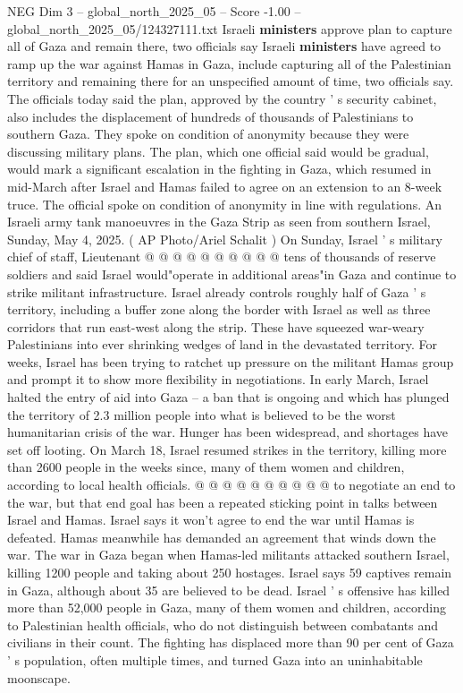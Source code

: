 \begin{textsample}{NEG Dim 3 – global\_north\_2025\_05 – Score -1.00 – global\_north\_2025\_05/124327111.txt}  \label{ex:f3_neg_317}
Israeli \textbf{ministers} approve plan to capture all of Gaza and remain there, two officials say Israeli \textbf{ministers} have agreed to ramp up the war against Hamas in Gaza, include capturing all of the Palestinian territory and remaining there for an unspecified amount of time, two officials say.
The officials today said the plan, approved by the country ' s security cabinet, also includes the displacement of hundreds of thousands of Palestinians to southern Gaza.
They spoke on condition of anonymity because they were discussing military plans.
The plan, which one official said would be gradual, would mark a significant escalation in the fighting in Gaza, which resumed in mid-March after Israel and Hamas failed to agree on an extension to an 8-week truce.
The official spoke on condition of anonymity in line with regulations.
An Israeli army tank manoeuvres in the Gaza Strip as seen from southern Israel, Sunday, May 4, 2025. ( AP Photo/Ariel Schalit ) On Sunday, Israel ' s military chief of staff, Lieutenant @ @ @ @ @ @ @ @ @ @ tens of thousands of reserve soldiers and said Israel would"operate in additional areas"in Gaza and continue to strike militant infrastructure.
Israel already controls roughly half of Gaza ' s territory, including a buffer zone along the border with Israel as well as three corridors that run east-west along the strip.
These have squeezed war-weary Palestinians into ever shrinking wedges of land in the devastated territory.
For weeks, Israel has been trying to ratchet up pressure on the militant Hamas group and prompt it to show more flexibility in negotiations.
In early March, Israel halted the entry of aid into Gaza -- a ban that is ongoing and which has plunged the territory of 2.3 million people into what is believed to be the worst humanitarian crisis of the war.
Hunger has been widespread, and shortages have set off looting.
On March 18, Israel resumed strikes in the territory, killing more than 2600 people in the weeks since, many of them women and children, according to local health officials. @ @ @ @ @ @ @ @ @ @ to negotiate an end to the war, but that end goal has been a repeated sticking point in talks between Israel and Hamas.
Israel says it won't agree to end the war until Hamas is defeated.
Hamas meanwhile has demanded an agreement that winds down the war.
The war in Gaza began when Hamas-led militants attacked southern Israel, killing 1200 people and taking about 250 hostages.
Israel says 59 captives remain in Gaza, although about 35 are believed to be dead.
Israel ' s offensive has killed more than 52,000 people in Gaza, many of them women and children, according to Palestinian health officials, who do not distinguish between combatants and civilians in their count.
The fighting has displaced more than 90 per cent of Gaza ' s population, often multiple times, and turned Gaza into an uninhabitable moonscape.

\end{textsample}
